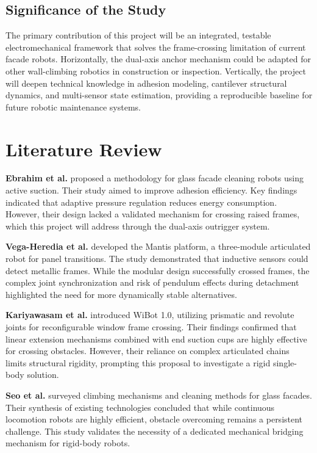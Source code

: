 \documentclass[12pt, a4paper]{article}
\begin{document}
\subsection{Significance of the Study}
The primary contribution of this project will be an integrated, testable electromechanical framework that solves the frame-crossing limitation of current facade robots. Horizontally, the dual-axis anchor mechanism could be adapted for other wall-climbing robotics in construction or inspection. Vertically, the project will deepen technical knowledge in adhesion modeling, cantilever structural dynamics, and multi-sensor state estimation, providing a reproducible baseline for future robotic maintenance systems.

\newpage

\section{Literature Review}

\textbf{Ebrahim et al.} proposed a methodology for glass facade cleaning robots using active suction. Their study aimed to improve adhesion efficiency. Key findings indicated that adaptive pressure regulation reduces energy consumption. However, their design lacked a validated mechanism for crossing raised frames, which this project will address through the dual-axis outrigger system.

\textbf{Vega-Heredia et al.} developed the Mantis platform, a three-module articulated robot for panel transitions. The study demonstrated that inductive sensors could detect metallic frames. While the modular design successfully crossed frames, the complex joint synchronization and risk of pendulum effects during detachment highlighted the need for more dynamically stable alternatives.

\textbf{Kariyawasam et al.} introduced WiBot 1.0, utilizing prismatic and revolute joints for reconfigurable window frame crossing. Their findings confirmed that linear extension mechanisms combined with end suction cups are highly effective for crossing obstacles. However, their reliance on complex articulated chains limits structural rigidity, prompting this proposal to investigate a rigid single-body solution.

\textbf{Seo et al.} surveyed climbing mechanisms and cleaning methods for glass facades. Their synthesis of existing technologies concluded that while continuous locomotion robots are highly efficient, obstacle overcoming remains a persistent challenge. This study validates the necessity of a dedicated mechanical bridging mechanism for rigid-body robots.
\end{document}
